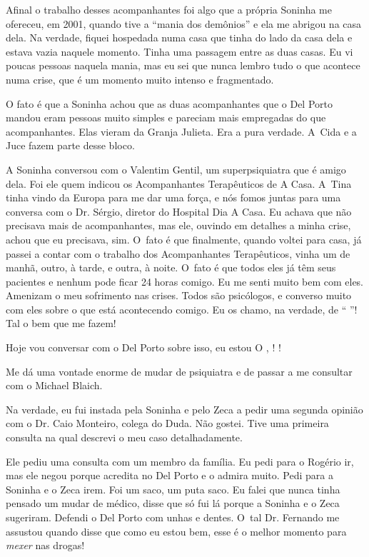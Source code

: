 Afinal o trabalho desses acompanhantes foi algo que a própria Soninha me
ofereceu, em 2001, quando tive a ``mania dos demônios'' e ela me abrigou
na casa dela. Na verdade, fiquei hospedada numa casa que tinha do lado
da casa dela e estava vazia naquele momento. Tinha uma passagem entre as
duas casas. Eu vi poucas pessoas naquela mania, mas eu sei que nunca
lembro tudo o que acontece numa crise, que é um momento muito intenso e
fragmentado.

O fato é que a Soninha achou que as duas acompanhantes que o Del Porto
mandou eram pessoas muito simples e pareciam mais empregadas do que
acompanhantes. Elas vieram da Granja Julieta. Era a pura verdade. A~Cida
e a Juce fazem parte desse bloco.

A Soninha conversou com o Valentim Gentil, um superpsiquiatra que é
amigo dela. Foi ele quem indicou os Acompanhantes Terapêuticos de A
Casa. A~Tina tinha vindo da Europa para me dar uma força, e nós fomos
juntas para uma conversa com o Dr. Sérgio, diretor do Hospital Dia A
Casa. Eu achava que não precisava mais de acompanhantes, mas ele,
ouvindo em detalhes a minha crise, achou que eu precisava, sim. O~fato é
que finalmente, quando voltei para casa, já passei a contar com o
trabalho dos Acompanhantes Terapêuticos, vinha um de manhã, outro, à
tarde, e outra, à noite. O~fato é que todos eles já têm seus pacientes e
nenhum pode ficar 24 horas comigo. Eu me senti muito bem com eles.
Amenizam o meu sofrimento nas crises. Todos são psicólogos, e converso
muito com eles sobre o que está acontecendo comigo. Eu os chamo, na
verdade, de `` \emph{}''! Tal o bem que me fazem!

Hoje vou conversar com o Del Porto sobre isso, eu estou    
O  ,    !    !

Me dá uma vontade enorme de mudar de psiquiatra e de passar a me
consultar com o Michael Blaich.

Na verdade, eu fui instada pela Soninha e pelo Zeca a pedir uma segunda
opinião com o Dr. Caio Monteiro, colega do Duda. Não gostei. Tive uma
primeira consulta na qual descrevi o meu caso detalhadamente.

Ele pediu uma consulta com um membro da família. Eu pedi para o Rogério
ir, mas ele negou porque acredita no Del Porto e o admira muito. Pedi
para a Soninha e o Zeca irem. Foi um saco, um puta saco. Eu falei que
nunca tinha pensado um mudar de médico, disse que só fui lá porque a
Soninha e o Zeca sugeriram. Defendi o Del Porto com unhas e dentes. O~tal Dr. Fernando me assustou quando disse que como eu estou bem, esse é
o melhor momento para \emph{mexer} nas drogas!

